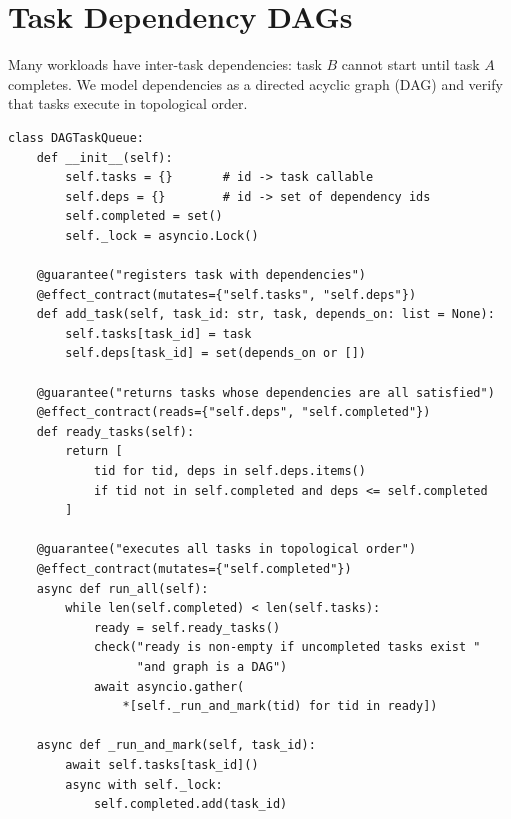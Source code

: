 \documentclass[11pt,a4paper]{report}
\theoremstyle{definition}
\theoremstyle{plain}
\begin{document}
\section{Task Dependency DAGs}

Many workloads have inter-task dependencies: task $B$ cannot start until
task $A$ completes.  We model dependencies as a directed acyclic graph
(DAG) and verify that tasks execute in topological order.

\begin{lstlisting}[style=synhopy]
class DAGTaskQueue:
    def __init__(self):
        self.tasks = {}       # id -> task callable
        self.deps = {}        # id -> set of dependency ids
        self.completed = set()
        self._lock = asyncio.Lock()

    @guarantee("registers task with dependencies")
    @effect_contract(mutates={"self.tasks", "self.deps"})
    def add_task(self, task_id: str, task, depends_on: list = None):
        self.tasks[task_id] = task
        self.deps[task_id] = set(depends_on or [])

    @guarantee("returns tasks whose dependencies are all satisfied")
    @effect_contract(reads={"self.deps", "self.completed"})
    def ready_tasks(self):
        return [
            tid for tid, deps in self.deps.items()
            if tid not in self.completed and deps <= self.completed
        ]

    @guarantee("executes all tasks in topological order")
    @effect_contract(mutates={"self.completed"})
    async def run_all(self):
        while len(self.completed) < len(self.tasks):
            ready = self.ready_tasks()
            check("ready is non-empty if uncompleted tasks exist "
                  "and graph is a DAG")
            await asyncio.gather(
                *[self._run_and_mark(tid) for tid in ready])

    async def _run_and_mark(self, task_id):
        await self.tasks[task_id]()
        async with self._lock:
            self.completed.add(task_id)
\end{lstlisting}
\end{document}

